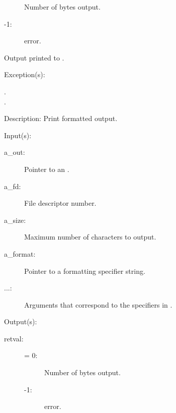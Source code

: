\begin{capi}
\begin{capilist}
\begin{description}
\begin{description}
				Number of bytes output.
			\item[-1: ]
				 error.
			\end{description}
		\item{Output printed to .}
		\end{description}
	\item[Exception(s): ]
		\begin{description}\item[]
		\item[.]
		\item[.]
		\end{description}
	\item[Description: ]
		Print formatted output.
	\end{capilist}
\label{out_put_fn}
\label{_cw_out_put_fn}
	\begin{capilist}
	\item[Input(s): ]
		\begin{description}\item[]
		\item[a\_out: ]
			Pointer to an .
		\item[a\_fd: ]
			File descriptor number.
		\item[a\_size: ]
			Maximum number of characters to output.
		\item[a\_format: ]
			Pointer to a formatting specifier string.
		\item[...: ]
			Arguments that correspond to the specifiers in
			.
		\end{description}
	\item[Output(s): ]
		\begin{description}\item[]
		\item[retval: ]
			\begin{description}\item[]
			\item[{\gt}= 0: ]
				Number of bytes output.
			\item[-1: ]
				 error.
			\end{description}

\end{description}
\end{capilist}
\end{capi}
